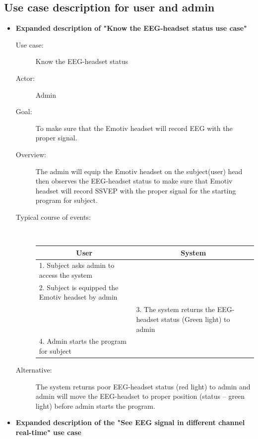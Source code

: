 \subsection{Use case description for user and admin}
\begin{itemize}
	
\item \textbf{Expanded description of "Know the EEG-headset status
use case" }

\begin{description}
	\item [Use case:] Know the EEG-headset status 
	\item [Actor:] Admin 
	\item [Goal:] To make sure that the Emotiv headset will record EEG with
	the proper signal. 
	\item [Overview:] The admin will equip the Emotiv headset on the subject(user)
	head then observes the EEG-headset status to make sure that Emotiv
	headset will record SSVEP with the proper signal for the starting
	program for subject. 
	\item [Typical course of events:]~

	{
		\centering
        
		\begin{tabular}{| m{.47\linewidth} | m{.47\linewidth} |}
			
		\hline 
		\multicolumn{1}{|c}{\textbf{User}} & 
  		\multicolumn{1}{|c|}{\textbf{System}}\\
		\hline 
		1. Subject asks admin to access the system &   \\
		\hline 
		2. Subject is equipped the Emotiv headset by admin  &   \\
		\hline 
		& 3. The system returns the EEG-headset status (Green light) to admin \\
		\hline 
		4. Admin starts the program for subject & \\
		\hline 
		
		\end{tabular} 
	}
	\item[Alternative:] The system returns poor EEG-headset status (red light) to admin and admin will move the EEG-headset to proper position (status – green light) before admin starts the program. 

\end{description}

\item \textbf{Expanded description of the "See EEG signal in different channel real-time" use case  }


\end{itemize}

